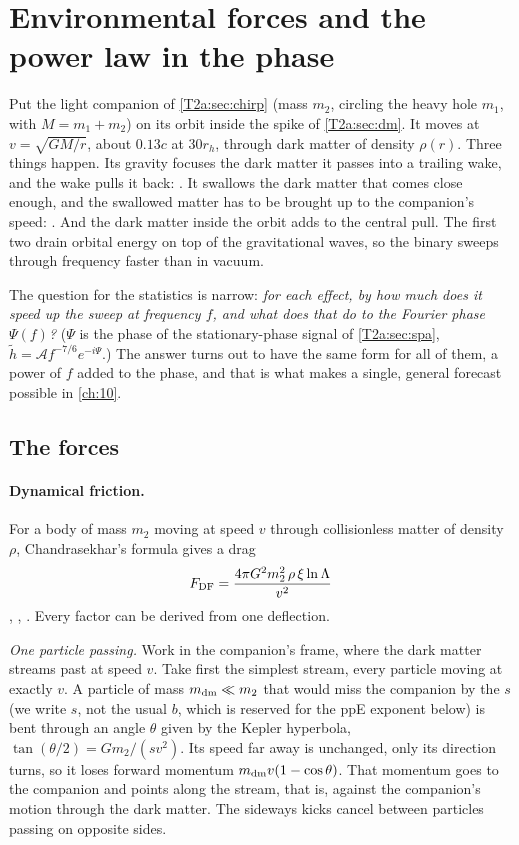 \section{Environmental forces and the power law in the phase}
\label{T2a:sec:forces}

Put the light companion of \cref{T2a:sec:chirp} (mass $m_2$, circling the heavy hole $m_1$, with $M=m_1+m_2$) on its orbit inside the spike of \cref{T2a:sec:dm}. It moves at $v=\sqrt{GM/r}$, about $0.13c$ at $30r_h$, through dark matter of density $\rho(r)$. Three things happen. Its gravity focuses the dark matter it passes into a trailing wake, and the wake pulls it back: . It swallows the dark matter that comes close enough, and the swallowed matter has to be brought up to the companion's speed: . And the dark matter inside the orbit adds to the central pull. The first two drain orbital energy on top of the gravitational waves, so the binary sweeps through frequency faster than in vacuum.

The question for the statistics is narrow: \emph{for each effect, by how much does it speed up the sweep at frequency $f$, and what does that do to the Fourier phase $\Psi(f)$?} ($\Psi$ is the phase of the stationary-phase signal of \cref{T2a:sec:spa}, $\tilde h=\mathcal Af^{-7/6}e^{-i\Psi}$.) The answer turns out to have the same form for all of them, a power of $f$ added to the phase, and that is what makes a single, general forecast possible in \cref{ch:10}.

\subsection{The forces}

\paragraph{Dynamical friction.}
For a body of mass $m_2$ moving at speed $v$ through collisionless matter of density $\rho$, Chandrasekhar's formula gives a drag
\begin{equation}
  F_{\rm DF}=\frac{4\pi G^2m_2^2\,\rho\,\xi\ln\Lambda}{v^2}
  \label{T2a:eq:df}
\end{equation}
\cite{Chandrasekhar1943}, \cite[eq.~(16)]{Eda2015}, \cite[eq.~(7)]{Coogan2022}. Every factor can be derived from one deflection.

\emph{One particle passing.} Work in the companion's frame, where the dark matter streams past at speed $v$. Take first the simplest stream, every particle moving at exactly $v$. A particle of mass $m_{\rm dm}\ll m_2$ that would miss the companion by the  $s$ (we write $s$, not the usual $b$, which is reserved for the ppE exponent below) is bent through an angle $\theta$ given by the Kepler hyperbola, $\tan(\theta/2)=Gm_2/(sv^2)$. Its speed far away is unchanged, only its direction turns, so it loses forward momentum $m_{\rm dm}v(1-\cos\theta)$. That momentum goes to the companion and points along the stream, that is, against the companion's motion through the dark matter. The sideways kicks cancel between particles passing on opposite sides.

